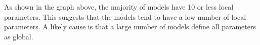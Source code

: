 \documentclass[portrait,a1paper,fontscale=0.49]{baposter}
\begin{document}
\begin{poster}
{\begin{multicols}{2}
 As shown in the graph above, the majority of models have 10 or less local parameters. This suggests that the models tend to have a low number of local parameters. A likely cause is that a large number of models define all parameters as global.
 \end{multicols}
 }
 
\end{poster}
\end{document}
